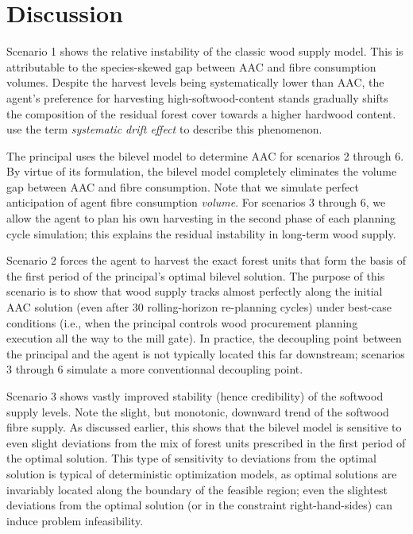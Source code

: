 
\section{Discussion}

Scenario 1 shows the relative instability of the classic wood supply model. This is attributable to the species-skewed gap between AAC and fibre consumption volumes. Despite the harvest levels being systematically lower than AAC, the agent's preference for harvesting high-softwood-content stands gradually shifts the composition of the residual forest cover towards a higher hardwood content. \citet{paradis2013risk} use the term \emph{systematic drift effect} to describe this phenomenon.   

The principal uses the bilevel model to determine AAC for scenarios 2 through 6. By virtue of its formulation, the bilevel model completely eliminates the volume gap between AAC and fibre consumption. Note that we simulate perfect anticipation of agent fibre consumption \emph{volume}. For scenarios 3 through 6, we allow the agent to plan his own harvesting in the second phase of each planning cycle simulation; this explains the residual instability in long-term wood supply.

Scenario 2 forces the agent to harvest the exact forest units that form the basis of the first period of the principal's optimal bilevel solution. The purpose of this scenario is to show that wood supply tracks almost perfectly along the initial AAC solution (even after 30 rolling-horizon re-planning cycles) under best-case conditions (i.e., when the principal controls wood procurement planning execution all the way to the mill gate). In practice, the decoupling point between the principal and the agent is not typically located this far downstream; scenarios 3 through 6 simulate a more conventionnal decoupling point.

Scenario 3 shows vastly improved stability (hence credibility) of the softwood supply levels. Note the slight, but monotonic, downward trend of the softwood fibre supply. As discussed earlier, this shows that the bilevel model is sensitive to even slight deviations from the mix of forest units prescribed in the first period of the optimal solution. This type of sensitivity to deviations from the optimal solution is typical of deterministic optimization models, as optimal solutions are invariably located along the boundary of the feasible region; even the slightest deviations from the optimal solution (or in the constraint right-hand-sides) can induce problem infeasibility.

